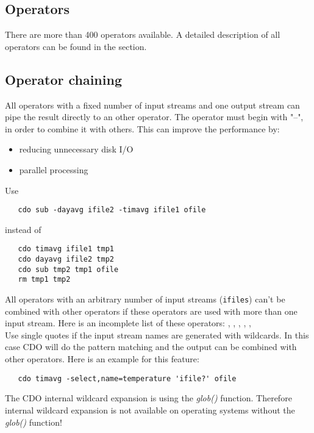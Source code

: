 \subsection{Operators}

There are more than 400 operators available.
A detailed description of all operators can be found in the
{\bf {}} section.


\subsection{Operator chaining}

All operators with a fixed number of input streams and one output stream
can pipe the result directly to an other operator.
The operator must begin with "--", in order to combine it with others.
This can improve the performance by:
\begin{itemize}
\item reducing unnecessary disk I/O
\item parallel processing
\end{itemize}
Use
\begin{verbatim}
   cdo sub -dayavg ifile2 -timavg ifile1 ofile
\end{verbatim}
instead of
\begin{verbatim}
   cdo timavg ifile1 tmp1
   cdo dayavg ifile2 tmp2
   cdo sub tmp2 tmp1 ofile
   rm tmp1 tmp2
\end{verbatim}

All operators with an arbitrary number of input streams ({\tt ifiles})
can't be combined with other operators if these operators are used
with more than one input stream. Here is an incomplete list of
these operators:
{\bf {}},
{\bf {}},
{\bf {}},
{\bf {}},
{\bf {}},
{\bf {}} \\
Use single quotes if the input stream names are generated with
wildcards. In this case CDO will do the pattern matching and the
output can be combined with other operators. Here is an example for
this feature:
\begin{verbatim}
   cdo timavg -select,name=temperature 'ifile?' ofile
\end{verbatim}

The CDO internal wildcard expansion is using the {\it glob()} function. 
Therefore internal wildcard expansion is not available on operating systems without the {\it glob()} function!

